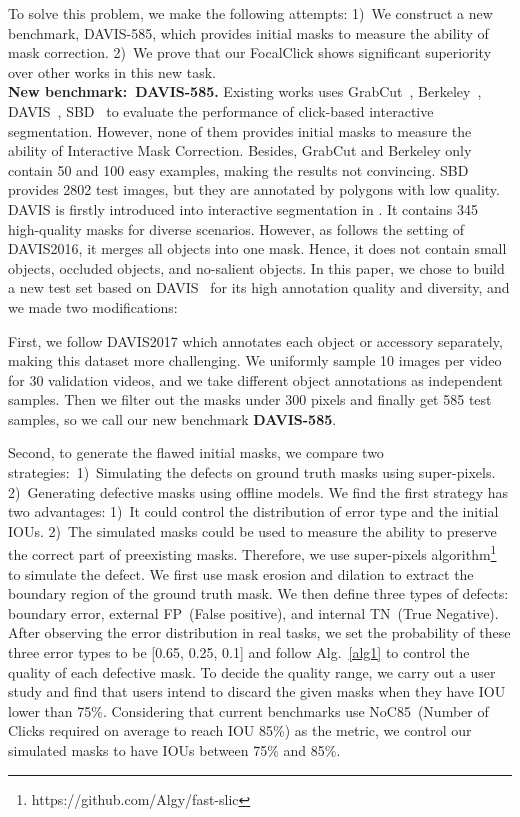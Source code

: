 \documentclass[10pt,twocolumn,letterpaper]{article}
\begin{document}
To solve this problem, we make the following attempts:
1)~We construct a new benchmark, DAVIS-585, which provides initial masks to measure the ability of mask correction.
2)~We prove that our FocalClick shows significant superiority over other works in this new task.\\

\noindent \textbf{New benchmark:~DAVIS-585. }Existing works uses GrabCut~\cite{rother2004grabcut}, Berkeley~\cite{berkeley}, DAVIS~\cite{davis}, SBD~\cite{SBD} to evaluate the performance of click-based interactive segmentation. However, none of them provides initial masks to measure the ability of Interactive Mask Correction. 
Besides, GrabCut and Berkeley only contain 50 and 100 easy examples, making the results not convincing. SBD provides 2802 test images, but they are annotated by polygons with low quality. DAVIS is firstly introduced into interactive segmentation in \cite{li2018latentdiversity}. It contains 345 high-quality masks for diverse scenarios. However, as \cite{li2018latentdiversity} follows the setting of DAVIS2016, it merges all objects into one mask. Hence, it does not contain small objects, occluded objects, and no-salient objects. In this paper, we chose to build a new test set based on DAVIS~\cite{davis} for its high annotation quality and diversity, and we made two modifications:  
 
 
First, we follow DAVIS2017 which annotates each object or accessory separately, making this dataset more challenging.  We uniformly sample 10 images per video for 30 validation videos, and we take different object annotations as independent samples. Then we filter out the masks under 300 pixels and finally get 585 test samples, so we call our new benchmark \textbf{DAVIS-585}.

Second, to generate the flawed initial masks, we compare two strategies:~1)~Simulating the defects on ground truth masks using super-pixels. 2)~Generating defective masks using offline models. We find the first strategy has two advantages: 1)~It could control the distribution of error type and the initial IOUs. 2)~The simulated masks could be used to measure the ability to preserve the correct part of preexisting masks. 
Therefore, we use super-pixels algorithm\footnote{https://github.com/Algy/fast-slic} to simulate the defect.  We first use mask erosion and dilation to extract the boundary region of the ground truth mask. We then define three types of defects: boundary error, external FP~(False positive), and internal TN~(True Negative).
After observing the error distribution in real tasks,  we set the probability of these three error types to be [0.65, 0.25, 0.1] and follow Alg.~\ref{alg1} to control the quality of each defective mask. To decide the quality range, we carry out a user study and find that users intend to discard the given masks when they have IOU lower than 75\%. Considering that current benchmarks use NoC85~(Number of Clicks required on average to reach IOU 85\%) as the metric, we control our simulated masks to have IOUs between 75\% and 85\%. \\
\end{document}
